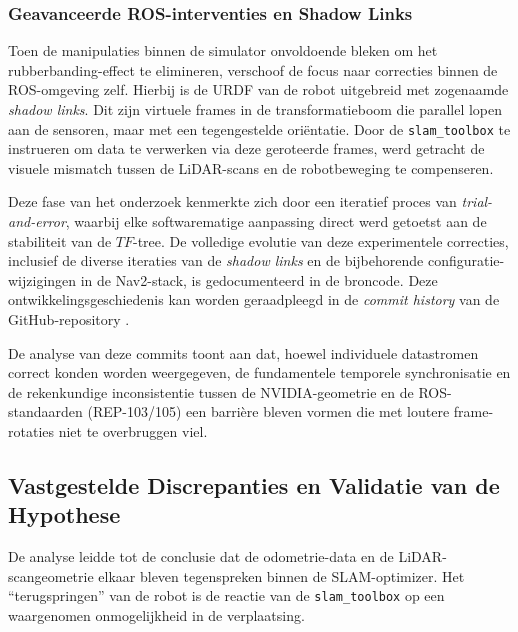\subsubsection{Geavanceerde ROS-interventies en Shadow Links}
Toen de manipulaties binnen de simulator onvoldoende bleken om het rubberbanding-effect te elimineren, verschoof de focus naar correcties binnen de ROS-omgeving zelf. Hierbij is de URDF van de robot uitgebreid met zogenaamde \textit{shadow links}. Dit zijn virtuele frames in de transformatieboom die parallel lopen aan de sensoren, maar met een tegengestelde oriëntatie. Door de \texttt{slam\_toolbox} te instrueren om data te verwerken via deze geroteerde frames, werd getracht de visuele mismatch tussen de LiDAR-scans en de robotbeweging te compenseren.

Deze fase van het onderzoek kenmerkte zich door een iteratief proces van \textit{trial-and-error}, waarbij elke softwarematige aanpassing direct werd getoetst aan de stabiliteit van de $TF$-tree. De volledige evolutie van deze experimentele correcties, inclusief de diverse iteraties van de \textit{shadow links} en de bijbehorende configuratie-wijzigingen in de Nav2-stack, is gedocumenteerd in de broncode. Deze ontwikkelingsgeschiedenis kan worden geraadpleegd in de \textit{commit history} van de GitHub-repository \autocite{Wyffels2026}. 

De analyse van deze commits toont aan dat, hoewel individuele datastromen correct konden worden weergegeven, de fundamentele temporele synchronisatie en de rekenkundige inconsistentie tussen de NVIDIA-geometrie en de ROS-standaarden (REP-103/105) een barrière bleven vormen die met loutere frame-rotaties niet te overbruggen viel.

\subsection{Vastgestelde Discrepanties en Validatie van de Hypothese}
\label{subsec:validatie_hypothese}

De analyse leidde tot de conclusie dat de odometrie-data en de LiDAR-scangeometrie elkaar bleven tegenspreken binnen de SLAM-optimizer. Het ``terugspringen'' van de robot is de reactie van de \texttt{slam\_toolbox} op een waargenomen onmogelijkheid in de verplaatsing.

